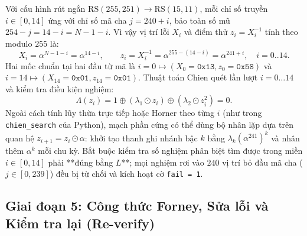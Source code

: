 Với cấu hình rút ngắn $\text{RS}(255,251) \to \text{RS}(15,11)$, mỗi chỉ số truyền $i \in [0, 14]$ ứng với chỉ số mã cha $j = 240 + i$, bảo toàn số mũ $254 - j = 14 - i = N - 1 - i$. Vì vậy vị trí lỗi $X_i$ và điểm thử $z_i = X_i^{-1}$ tính theo modulo $255$ là:
\begin{equation}
X_i = \alpha^{N-1-i} = \alpha^{14-i}, \qquad z_i = X_i^{-1} = \alpha^{255-(14-i)} = \alpha^{241+i}, \quad i = 0..14.
\label{eq:chien_mapping}
\end{equation}
Hai mốc chuẩn tại hai đầu từ mã là $i=0 \mapsto (X_0=\texttt{0x13}, z_0=\texttt{0x58})$ và $i=14 \mapsto (X_{14}=\texttt{0x01}, z_{14}=\texttt{0x01})$. Thuật toán Chien quét lần lượt $i = 0 \dots 14$ và kiểm tra điều kiện nghiệm:
\begin{equation}
\Lambda(z_i) = 1 \oplus (\lambda_1 \odot z_i) \oplus (\lambda_2 \odot z_i^2) = 0.
\end{equation}
Ngoài cách tính lũy thừa trực tiếp hoặc Horner theo từng $i$ (như trong \texttt{chien\_search} của Python), mạch phần cứng có thể dùng bộ nhân lặp dựa trên quan hệ $z_{i+1} = z_i \odot \alpha$: khởi tạo thanh ghi nhánh bậc $k$ bằng $\lambda_k (\alpha^{241})^k$ và nhân thêm $\alpha^k$ mỗi chu kỳ. Bắt buộc kiểm tra số nghiệm phân biệt tìm được trong miền $i \in [0, 14]$ phải **đúng bằng $L$**; mọi nghiệm rơi vào $240$ vị trí bỏ đầu mã cha ($j \in [0, 239]$) đều bị từ chối và kích hoạt cờ \texttt{fail = 1}.

\subsection{Giai đoạn 5: Công thức Forney, Sửa lỗi và Kiểm tra lại (Re-verify)}

